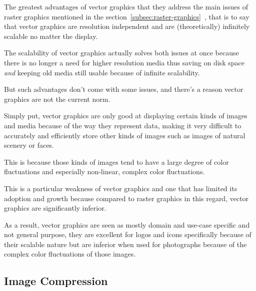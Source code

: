 \documentclass[12pt]{article}
\newcommand{\sentence}{} %
\newcommand{\italic}[1]{\textit{#1}}
\newcommand{\fullref}[1]{\ref{#1}~\nameref{#1}}
\begin{document}
    \bigskip
    The greatest advantages of vector graphics that they address the main issues of raster graphics mentioned in
    the section~\fullref{subsec:raster-graphics}, that is to say that vector graphics are resolution independent
    and are (theoretically) infinitely scalable no matter the display.
    \sentence
    The scalability of vector graphics actually solves both issues at once because there is no longer a need for
    higher resolution media thus saving on disk space \italic{and} keeping old media still usable because of infinite
    scalability.
    \sentence
    But such advantages don't come with some issues, and there's a reason vector graphics are not the current norm.
    \sentence
    Simply put, vector graphics are only good at displaying certain kinds of images and media because of the way they
    represent data, making it very difficult to accurately and efficiently store other kinds of images such as images
    of natural scenery or faces.
    \sentence
    This is because those kinds of images tend to have a large degree of color fluctuations and especially
    non-linear, complex color fluctuations.
    \sentence
    This is a particular weakness of vector graphics and one that has limited its adoption and growth because
    compared to raster graphics in this regard, vector graphics are significantly inferior.
    \sentence
    As a result, vector graphics are seen as mostly domain and use-case specific and not general purpose, they are
    excellent for logos and icons specifically because of their scalable nature but are inferior when used for
    photographs because of the complex color fluctuations of those images.



    \subsection{Image Compression}\label{subsec:image-compression}
\end{document}
